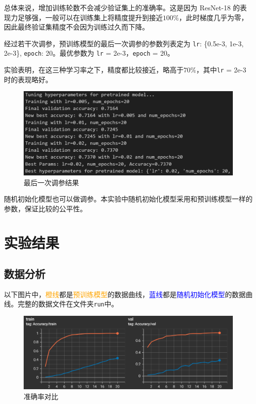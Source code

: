 \documentclass[notitlepage,cs4size,punct,oneside]{ctexrep}
\numberwithin{equation}{chapter}
\theoremstyle{mystyle}
\begin{document}
总体来说，增加训练轮数不会减少验证集上的准确率。这是因为 ResNet-18 的表现力足够强，一般可以在训练集上将精度提升到接近$100\%$，此时梯度几乎为零，因此最终验证集精度不会因为训练过久而下降。

经过若干次调参，预训练模型的最后一次调参的参数列表定为 \texttt{lr}: \{0.5e-3, 1e-3, 2e-3\}, \texttt{epoch}: 20。最优参数为 \texttt{lr} = 2e-3，\texttt{epoch} = 20。

实验表明，在这三种学习率之下，精度都比较接近，略高于$70\%$，其中\texttt{lr} = 2e-3时的表现略好。

\begin{figure}[H]
    \centering
    \includegraphics[scale=0.7]{fine.png}
    \caption{最后一次调参结果}
    \label{fig:fine}
\end{figure}

随机初始化模型也可以做调参。本实验中随机初始化模型采用和预训练模型一样的参数，保证比较的公平性。



\section{实验结果}
\subsection{数据分析}
以下图片中，\textcolor{orange}{橙线}都是\textcolor{orange}{预训练模型}的数据曲线，\textcolor{blue}{蓝线}都是\textcolor{blue}{随机初始化模型}的数据曲线。完整的数据文件在文件夹\texttt{run}中。

\begin{figure}[H]
    \centering
    \includegraphics[scale=0.75]{acc.png}
    \caption{准确率对比}
    \label{fig:acc}
\end{figure}
\end{document}
